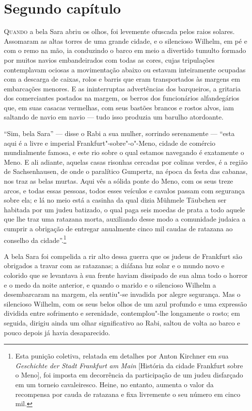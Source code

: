 \chapter{Segundo capítulo}

\textsc{Quando} a bela Sara abriu os olhos, foi levemente ofuscada pelos raios
solares. Assomaram as altas torres de uma grande cidade, e o silencioso
Wilhelm, em pé e com o remo na mão, ia conduzindo o barco em meio a
divertido tumulto formado por muitos navios embandeirados com todas as
cores, cujas tripulações contemplavam ociosas a movimentação abaixo ou
estavam inteiramente ocupadas com a descarga de caixas, rolos e barris
que eram transportados às margens em embarcações menores. E as
ininterruptas advertências dos barqueiros, a gritaria dos comerciantes
postados na margem, os berros dos funcionários alfandegários que, em
suas casacas vermelhas, com seus bastões brancos e rostos alvos, iam
saltando de navio em navio --- tudo isso produzia um barulho atordoante.

``Sim, bela Sara'' --- disse o Rabi a sua mulher, sorrindo serenamente ---
``esta aqui é a livre e imperial Frankfurt"-sobre"-o"-Meno, cidade de
comércio mundialmente famosa, e este rio sobre o qual estamos navegando
é exatamente o Meno. E ali adiante, aquelas casas risonhas cercadas por
colinas verdes, é a região de Sachsenhausen, de onde o paralítico
Gumpertz, na época da festa das cabanas, nos traz as belas murtas. Aqui
vês a sólida ponte do Meno, com os seus treze arcos, e todas essas
pessoas, todos esses veículos e cavalos passam com segurança sobre ela;
e lá no meio está a casinha da qual dizia Mühmele Täubchen ser habitada
por um judeu batizado, o qual paga seis moedas de prata a todo aquele
que lhe traz uma ratazana morta, auxiliando desse modo a comunidade
judaica a cumprir a obrigação de entregar anualmente cinco mil caudas
de ratazana ao conselho da
cidade''.\footnote{ Esta
punição coletiva, relatada em detalhes por Anton Kirchner em sua
\textit{Geschichte der Stadt Frankfurt am Main} [História da cidade
Frankfurt sobre o Meno], foi imposta em decorrência da participação de
um judeu disfarçado em um torneio cavaleiresco. Heine, no entanto,
aumenta o valor da recompensa por cauda de ratazana e fixa livremente o
seu número em cinco mil.}


A bela Sara foi compelida a rir alto dessa guerra que os judeus de
Frankfurt são obrigados a travar com as ratazanas; a diáfana luz solar
e o mundo novo e colorido que se levantava à sua frente haviam
dissipado de sua alma todo o horror e o medo da noite anterior, e
quando o marido e o silencioso Wilhelm a desembarcaram na margem, ela
sentiu"-se invadida por alegre segurança. Mas o silencioso Wilhelm,
com os seus belos olhos de um azul profundo e uma expressão dividida
entre sofrimento e serenidade, contemplou"-lhe longamente o rosto; em
seguida, dirigiu ainda um olhar significativo ao Rabi, saltou de volta
ao barco e pouco depois já havia desaparecido.

